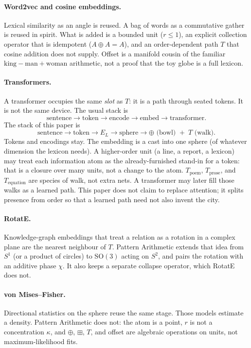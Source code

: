 \documentclass[12pt, a4paper]{article}
\begin{document}
\paragraph{Word2vec and cosine embeddings.}
Lexical similarity as an angle is reused. A bag of words as a
commutative gather is reused in spirit. What is added is a bounded unit
($r\le 1$), an explicit collection operator that is idempotent
($A\oplus A=A$), and an order-dependent path $T$ that cosine addition
does not supply. Offset is a manifold cousin of the familiar
$\mathrm{king}-\mathrm{man}+\mathrm{woman}$ arithmetic, not a proof
that the toy globe is a full lexicon.

\paragraph{Transformers.}
A transformer occupies the same \emph{slot} as $T$: it is a path
through seated tokens. It is not the same device. The usual stack is
\[
\text{sentence}\to\text{token}\to\text{encode}\to\text{embed}\to\text{transformer}.
\]
The stack of this paper is
\[
\text{sentence}\to\text{token}\to E_L\to\text{sphere}\to
\oplus\text{ (bowl) }+\; T\text{ (walk)}.
\]
Tokens and encodings stay. The embedding is a cast into one sphere
(of whatever dimension the lexicon needs). A higher-order unit (a
line, a report, a lexicon) may treat each information atom as the
already-furnished stand-in for a token: that is a closure over many
units, not a change to the atom. $T_{\mathrm{poem}}$,
$T_{\mathrm{prose}}$, and $T_{\mathrm{equation}}$ are species of
walk, not extra nets. A transformer may later fill those walks as a
learned path. This paper does not claim to replace attention; it
splits presence from order so that a learned path need not also
invent the city.

\paragraph{RotatE.}
Knowledge-graph embeddings that treat a relation as a rotation in a
complex plane are the nearest neighbour of $T$. Pattern Arithmetic
extends that idea from $S^1$ (or a product of circles) to
$\mathrm{SO}(3)$ acting on $S^2$, and pairs the rotation with an
additive phase $\chi$. It also keeps a separate collapse operator,
which RotatE does not.

\paragraph{von Mises--Fisher.}
Directional statistics on the sphere reuse the same stage.
Those models estimate a density. Pattern Arithmetic does not: the atom
is a point, $r$ is not a concentration $\kappa$, and $\oplus$, $\boxplus$, $T$, and
offset are algebraic operations on units, not maximum-likelihood fits.
\end{document}
